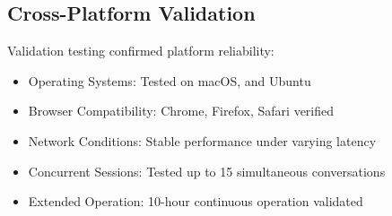\documentclass[11pt,letterpaper]{article}
\begin{document}
\subsection{Cross-Platform Validation}

Validation testing confirmed platform reliability:

\begin{itemize}
    \item Operating Systems: Tested on macOS, and Ubuntu
    \item Browser Compatibility: Chrome, Firefox, Safari verified
    \item Network Conditions: Stable performance under varying latency
    \item Concurrent Sessions: Tested up to 15 simultaneous conversations
    \item Extended Operation: 10-hour continuous operation validated
\end{itemize}
\end{document}
